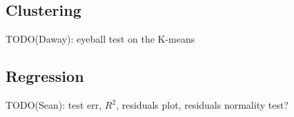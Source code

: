 
\subsection{Clustering}

TODO(Daway): eyeball test on the K-means

\subsection{Regression}

TODO(Sean): test err, $R^2$, residuals plot, residuals normality test?
